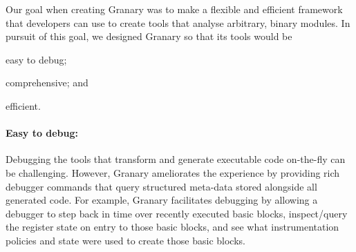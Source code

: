 \documentclass[preprint]{sigplanconf}
\begin{document}
Our goal when creating Granary was to make a flexible and efficient framework that developers can use to create tools that analyse arbitrary, binary modules. In pursuit of this goal, we designed Granary so that its tools would be \begin{inparaenum}[i)]
	\item easy to debug;
	\item comprehensive; and
	\item efficient.
\end{inparaenum}





\paragraph{Easy to debug:} Debugging the tools that transform and generate executable code on-the-fly can be challenging. However, Granary ameliorates the experience by providing rich debugger commands that query structured meta-data stored alongside all generated code. For example, Granary facilitates debugging by allowing a debugger to step back in time over recently executed basic blocks, inspect/query the register state on entry to those basic blocks, and see what instrumentation policies and state were used to create those basic blocks.
\end{document}
